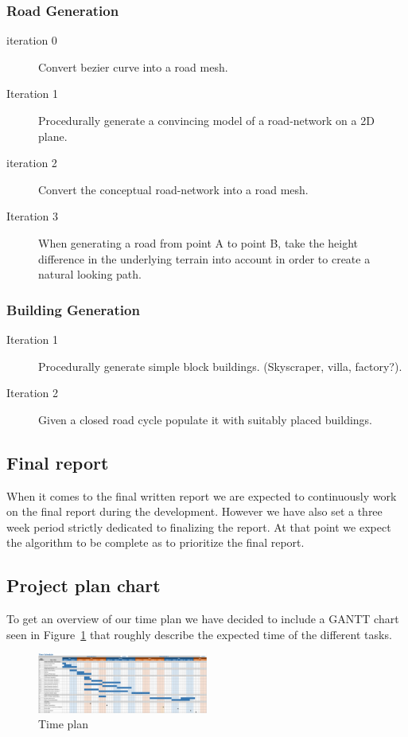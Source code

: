 \subsubsection{Road Generation}
\begin{description}
  \item[iteration 0] Convert bezier curve into a road mesh. %
  \item[Iteration 1] Procedurally generate a convincing model of a road-network on a 2D plane.
  \item[iteration 2] Convert the conceptual road-network into a road mesh.
  \item[Iteration 3] When generating a road from point A to point B, take the height difference in the underlying terrain into account in order to create a natural looking path.
\end{description}

\subsubsection{Building Generation}
\begin{description}
  \item[Iteration 1] Procedurally generate simple block buildings. (Skyscraper, villa, factory?).
  \item[Iteration 2] Given a closed road cycle populate it with suitably placed buildings.
\end{description}


\subsection{Final report}
When it comes to the final written report we are expected to continuously work on the final report during the development.
However we have also set a three week period strictly dedicated to finalizing the report.
At that point we expect the algorithm to be complete as to prioritize the final report.

\subsection{Project plan chart}
To get an overview of our time plan we have decided to include a GANTT chart seen in Figure~\ref{fig:time-plan} that roughly describe the expected time of the different tasks.

\newpage
\begin{figure}[H]
  \centering
  \vspace*{-1.0cm}
  \includegraphics[angle=90, width=0.5\textwidth]{figure/time-plan.png}
  \caption{Time plan}
  \label{fig:time-plan}
\end{figure}



